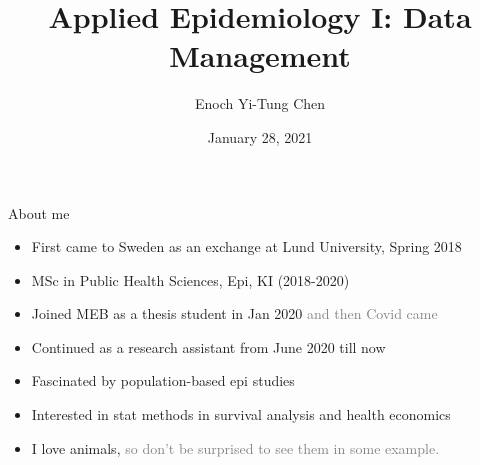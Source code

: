 


\title[Applied Epi I: Data Management]{Applied Epidemiology I: Data Management}
\date{January 28, 2021}
\author[Enoch Yi-Tung Chen]{Enoch Yi-Tung Chen}




\begin{frame}
\maketitle 
\end{frame}

\begin{frame}{About me}
\begin{itemize}
\item<1|handout:1-> First came to Sweden as an exchange at Lund University, Spring 2018
\item<1|handout:1-> MSc in Public Health Sciences, Epi, KI (2018-2020)
\item<2|handout:2-> Joined MEB as a thesis student in Jan 2020 \textcolor{gray}{and then Covid came}
\item<2|handout:2->Continued as a research assistant from June 2020 till now
\item<3|handout:3->Fascinated by population-based epi studies
\item<3|handout:3-> Interested in stat methods in survival analysis and health economics
\item<4|handout:4-> I love animals, \textcolor{gray}{so don't be surprised to see them in some example.}

\end{itemize}
\end{frame}

